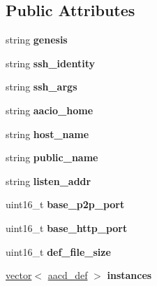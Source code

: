 \subsection*{Public Attributes}
\begin{DoxyCompactItemize}
\item 
\mbox{\label{classhost__def_aee8feea4283d48463de633250b4d373f}} 
string {\bfseries genesis}
\item 
\mbox{\label{classhost__def_afd21f506628e25aa790814fb87c82ce1}} 
string {\bfseries ssh\+\_\+identity}
\item 
\mbox{\label{classhost__def_a6f687b402dd12c18a1a271229ca512cc}} 
string {\bfseries ssh\+\_\+args}
\item 
\mbox{\label{classhost__def_ab351b88cf2bdb273cfb337a2223866a6}} 
string {\bfseries aacio\+\_\+home}
\item 
\mbox{\label{classhost__def_a2390479e008b3219330faeec62c0dd8d}} 
string {\bfseries host\+\_\+name}
\item 
\mbox{\label{classhost__def_af3513833c3e552feacc7b868c2bd782d}} 
string {\bfseries public\+\_\+name}
\item 
\mbox{\label{classhost__def_af52d66be013cc745053305b9662bc30e}} 
string {\bfseries listen\+\_\+addr}
\item 
\mbox{\label{classhost__def_a5510c0b43d1750bf6011853d813d0dc1}} 
uint16\+\_\+t {\bfseries base\+\_\+p2p\+\_\+port}
\item 
\mbox{\label{classhost__def_a1c10b6580824b2f90eb531bb635462cf}} 
uint16\+\_\+t {\bfseries base\+\_\+http\+\_\+port}
\item 
\mbox{\label{classhost__def_ad63399de51f510a467adaee242756d9e}} 
uint16\+\_\+t {\bfseries def\+\_\+file\+\_\+size}
\item 
\mbox{\label{classhost__def_aee2e4bced0cdc2846fbfacc1c4b4a049}} 
\mbox{\hyperlink{classstd_1_1vector}{vector}}$<$ \mbox{\hyperlink{classaacd__def}{aacd\+\_\+def}} $>$ {\bfseries instances}
\end{DoxyCompactItemize}
